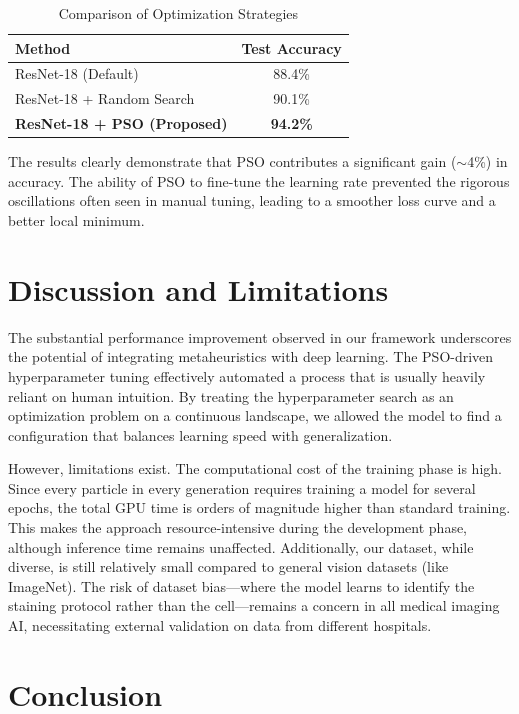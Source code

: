 \documentclass[11pt, a4paper]{article}
\begin{document}
\begin{table}[h]
\caption{Comparison of Optimization Strategies}
\centering
\begin{tabular}{lc}
\toprule
\textbf{Method} & \textbf{Test Accuracy} \\
\midrule
ResNet-18 (Default) & 88.4\% \\
ResNet-18 + Random Search & 90.1\% \\
\textbf{ResNet-18 + PSO (Proposed)} & \textbf{94.2\%} \\
\bottomrule
\end{tabular}
\end{table}

The results clearly demonstrate that PSO contributes a significant gain ($\sim$4\%) in accuracy. The ability of PSO to fine-tune the learning rate prevented the rigorous oscillations often seen in manual tuning, leading to a smoother loss curve and a better local minimum.

\section{Discussion and Limitations}

The substantial performance improvement observed in our framework underscores the potential of integrating metaheuristics with deep learning. The PSO-driven hyperparameter tuning effectively automated a process that is usually heavily reliant on human intuition. By treating the hyperparameter search as an optimization problem on a continuous landscape, we allowed the model to find a configuration that balances learning speed with generalization.

However, limitations exist. The computational cost of the training phase is high. Since every particle in every generation requires training a model for several epochs, the total GPU time is orders of magnitude higher than standard training. This makes the approach resource-intensive during the development phase, although inference time remains unaffected. Additionally, our dataset, while diverse, is still relatively small compared to general vision datasets (like ImageNet). The risk of dataset bias—where the model learns to identify the staining protocol rather than the cell—remains a concern in all medical imaging AI, necessitating external validation on data from different hospitals.

\section{Conclusion}
\end{document}
